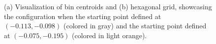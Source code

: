 \documentclass[
  12pt]{article}
\begin{document}
\begin{figure}[H]


\caption{\label{fig-scurveshifthexgridsexp}(a) Visualization of bin
centroids and (b) hexagonal grid, showcasing the configuration when the
starting point defined at \((-0.113, -0.098)\) (colored in gray) and the
starting point defined at \((-0.075, -0.195)\) (colored in light
orange).}

\end{figure}%
\end{document}
